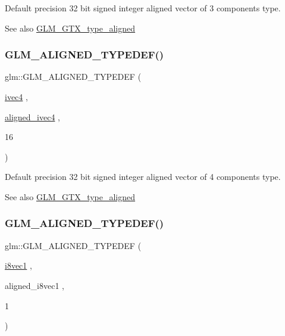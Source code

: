 Default precision 32 bit signed integer aligned vector of 3 components type. \begin{DoxySeeAlso}{See also}
\mbox{\hyperlink{group__gtx__type__aligned}{G\+L\+M\+\_\+\+G\+T\+X\+\_\+type\+\_\+aligned}} 
\end{DoxySeeAlso}
\mbox{\label{group__gtx__type__aligned_ga50d8a9523968c77f8325b4c9bfbff41e}} 
\subsubsection{\texorpdfstring{GLM\_ALIGNED\_TYPEDEF()}{GLM\_ALIGNED\_TYPEDEF()}\hspace{0.1cm}{\footnotesize\ttfamily [52/209]}}
{\footnotesize\ttfamily glm\+::\+G\+L\+M\+\_\+\+A\+L\+I\+G\+N\+E\+D\+\_\+\+T\+Y\+P\+E\+D\+EF (\begin{DoxyParamCaption}\item[{\mbox{\hyperlink{group__core__types_gaa4560ddc50320ea8f8a70d5c9c249fea}{ivec4}}}]{,  }\item[{\mbox{\hyperlink{group__gtc__type__aligned_gaa33169a30c7d22a8648f20b4534f635f}{aligned\+\_\+ivec4}}}]{,  }\item[{16}]{ }\end{DoxyParamCaption})}

Default precision 32 bit signed integer aligned vector of 4 components type. \begin{DoxySeeAlso}{See also}
\mbox{\hyperlink{group__gtx__type__aligned}{G\+L\+M\+\_\+\+G\+T\+X\+\_\+type\+\_\+aligned}} 
\end{DoxySeeAlso}
\mbox{\label{group__gtx__type__aligned_ga9ec20fdfb729c702032da9378c79679f}} 
\subsubsection{\texorpdfstring{GLM\_ALIGNED\_TYPEDEF()}{GLM\_ALIGNED\_TYPEDEF()}\hspace{0.1cm}{\footnotesize\ttfamily [53/209]}}
{\footnotesize\ttfamily glm\+::\+G\+L\+M\+\_\+\+A\+L\+I\+G\+N\+E\+D\+\_\+\+T\+Y\+P\+E\+D\+EF (\begin{DoxyParamCaption}\item[{\mbox{\hyperlink{group__gtc__type__precision_ga1cb1ef0f2a9266aba88f161c9062cebc}{i8vec1}}}]{,  }\item[{aligned\+\_\+i8vec1}]{,  }\item[{1}]{ }\end{DoxyParamCaption})}


